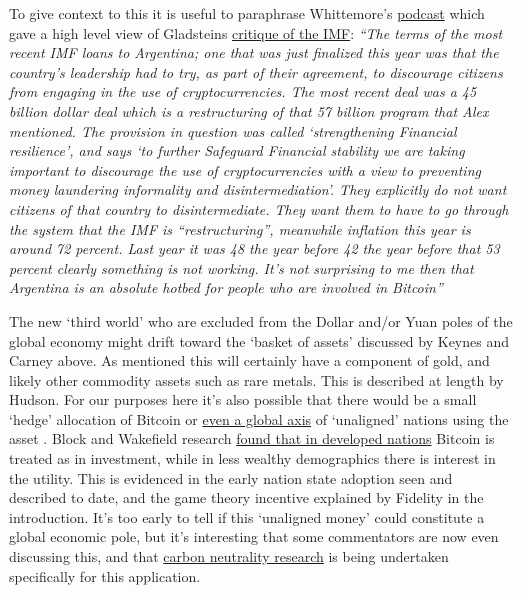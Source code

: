 To give context to this it is useful to paraphrase Whittemore's \href{https://www.youtube.com/watch?v=LOqQSKbfRu4}{podcast} which gave a high level view of Gladsteins \href{https://bitcoinmagazine.com/culture/imf-world-bank-repress-poor-countries}{critique of the IMF}: \textit{``The terms of the most recent IMF loans to Argentina; one that was just finalized this year was that the country's leadership had to try, as part of their agreement, to discourage citizens from engaging in the use of cryptocurrencies. The most recent deal was a 45 billion dollar deal which is a restructuring of that 57 billion program that Alex mentioned. The provision in question was called `strengthening Financial resilience', and says `to further Safeguard Financial stability we are taking important to discourage the use of cryptocurrencies with a view to preventing money laundering informality and disintermediation'. They explicitly do not want citizens of that country to disintermediate. They want them to have to go through the system that the IMF is ``restructuring'', meanwhile inflation this
year is around 72 percent. Last year it was 48 the year before 42 the year before that 53 percent clearly something is not working. It's not surprising to me then that Argentina is an absolute hotbed for people who are involved in
Bitcoin''} \par
The new `third world' who are excluded from the Dollar and/or Yuan poles of the global economy might drift toward the `basket of assets' discussed by Keynes and Carney above. As mentioned this will certainly have a component of gold, and likely other commodity assets such as rare metals. This is described at length by Hudson\cite{hudson2021destiny}. For our purposes here it's also possible that there would be a small `hedge' allocation of Bitcoin or \href{https://www.independent.co.uk/tech/bitcoin-el-salvador-crypto-btc-b2079881.html}{even a global axis} of `unaligned' nations using the asset \cite{hendrickson2021value, ferranti2022hedging}. Block and Wakefield research \href{https://block.xyz/2022/btc-report.pdf}{found that in developed nations} Bitcoin is treated as in investment, while in less wealthy demographics there is interest in the utility. This is evidenced in the early nation state adoption seen and described to date, and the game theory incentive explained by Fidelity in the introduction. It's too early to tell if this `unaligned money' could constitute a global economic pole, but it's interesting that some commentators are now even discussing this, and that \href{https://docs.google.com/document/d/1Ynl5bbdTqev-wbTAWQoeWdh1cJVf3ortuSjre9K9wGQ/edit}{carbon neutrality research} is being undertaken specifically for this application.
